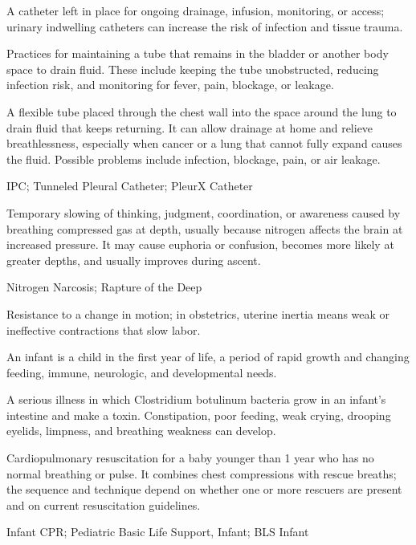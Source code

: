  A catheter left in place for ongoing drainage, infusion, monitoring, or access; urinary indwelling catheters can increase the risk of infection and tissue trauma.

 Practices for maintaining a tube that remains in the bladder or another body space to drain fluid. These include keeping the tube unobstructed, reducing infection risk, and monitoring for fever, pain, blockage, or leakage.

 A flexible tube placed through the chest wall into the space around the lung to drain fluid that keeps returning. It can allow drainage at home and relieve breathlessness, especially when cancer or a lung that cannot fully expand causes the fluid. Possible problems include infection, blockage, pain, or air leakage.

\synonyms
IPC; Tunneled Pleural Catheter; PleurX Catheter

 Temporary slowing of thinking, judgment, coordination, or awareness caused by breathing compressed gas at depth, usually because nitrogen affects the brain at increased pressure. It may cause euphoria or confusion, becomes more likely at greater depths, and usually improves during ascent.

\synonyms
Nitrogen Narcosis; Rapture of the Deep

 Resistance to a change in motion; in obstetrics, uterine inertia means weak or ineffective contractions that slow labor.

 An infant is a child in the first year of life, a period of rapid growth and changing feeding, immune, neurologic, and developmental needs.

 A serious illness in which Clostridium botulinum bacteria grow in an infant’s intestine and make a toxin. Constipation, poor feeding, weak crying, drooping eyelids, limpness, and breathing weakness can develop.

 Cardiopulmonary resuscitation for a baby younger than 1 year who has no normal breathing or pulse. It combines chest compressions with rescue breaths; the sequence and technique depend on whether one or more rescuers are present and on current resuscitation guidelines.

\synonyms
Infant CPR; Pediatric Basic Life Support, Infant; BLS Infant

